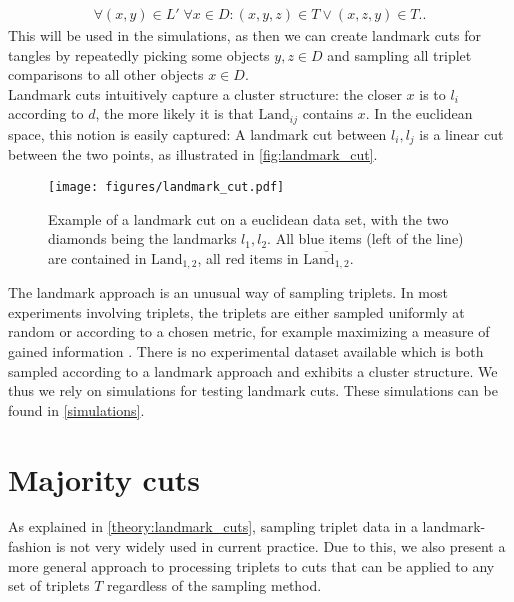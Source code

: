 \begin{align*}
    \forall (x,y) \in L' \; \forall x \in D: (x, y, z) \in T \vee (x, z, y) \in T.
.\end{align*}
This will be used in the simulations, as then we can create landmark cuts for tangles by 
repeatedly picking some objects $y, z \in D$ and sampling all triplet comparisons to all other objects $x \in D$. \\

Landmark cuts intuitively capture a cluster structure: 
the closer $x$ is to $l_i$ according to $d$, the more likely it is that $\text{Land}_{ij}$ contains $x$. 
In the euclidean space, this notion is easily captured: A landmark cut between $l_i, l_j$ is
a linear cut between the two points, as illustrated in \autoref{fig:landmark_cut}.

    \begin{figure}[ht]
        \centering
        \texttt{[image: figures/landmark\_cut.pdf]}
        \caption{Example of a landmark cut on a euclidean data set, with the two diamonds 
            being the landmarks $l_1, l_2$. All blue items (left of the line) 
            are contained in $\text{Land}_{1,2}$, all red items in $\overline{\text{Land} _{1,2}}$.}
        \label{fig:landmark_cut}
    \end{figure}

The landmark approach is an unusual way of sampling triplets.
In most experiments involving triplets, the triplets are either sampled uniformly at random
\citep{kleindessnerLensDepthFunction2017, haghiriEstimationPerceptualScales2020} 
or according to a chosen metric, for example maximizing a measure of gained information \citep{roadsEnrichingImageNetHuman2021}. 
There is no experimental dataset available which is both sampled according to a landmark approach and exhibits a cluster structure. 
We thus we rely on simulations for testing landmark cuts. These simulations can be found in \autoref{simulations}.

\section{Majority cuts}\label{theory:majority_cuts}
As explained in \autoref{theory:landmark_cuts}, sampling triplet data in a landmark-fashion is not very widely used in current practice. Due to this, we 
also present a more general approach to processing triplets to cuts that can be applied to any set of triplets $T$ regardless of the sampling method.

